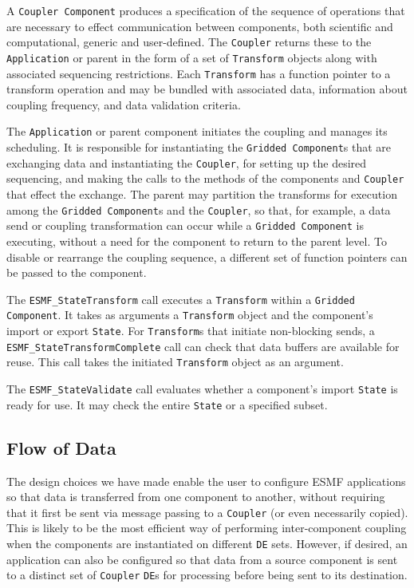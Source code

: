 A {\tt Coupler Component} produces a specification of the sequence of 
operations that are necessary to effect communication between components, 
both scientific and computational, generic and user-defined.  The {\tt Coupler} 
returns these to the {\tt Application} or parent in the form of a set of {\tt Transform} objects 
along with associated sequencing restrictions.  Each {\tt Transform} has a
function pointer to a transform operation and may be bundled with 
associated data, information about coupling frequency, and 
data validation criteria.

The {\tt Application} or parent component initiates the coupling and manages 
its scheduling.  It is responsible for instantiating the {\tt Gridded Component}s
that are exchanging data and instantiating the {\tt Coupler}, for setting up the desired 
sequencing, and making the calls to the methods of the components and 
{\tt Coupler} that effect the exchange.  The parent may partition the 
transforms
for execution among the {\tt Gridded Component}s and the {\tt Coupler}, so that, for 
example, a data send or coupling transformation can occur while a {\tt Gridded 
Component} is executing, without a need for the component to return to the
parent level.  
To disable or rearrange the coupling sequence, a different set of function
pointers can be passed to the component.

The {\tt ESMF\_StateTransform} call executes a {\tt Transform} 
within a {\tt Gridded Component}.  It takes as arguments a
{\tt Transform} object and the component's import or export {\tt State}.  
For {\tt Transform}s that initiate non-blocking sends, a {\tt ESMF\_StateTransformComplete} 
call can check that data  buffers are available for reuse.  This 
call takes the initiated {\tt Transform} object as an argument.

The {\tt ESMF\_StateValidate} call evaluates whether a component's 
import {\tt State} is ready for use.  It may check the entire {\tt State} or 
a specified subset.

\subsection{Flow of Data}
\label{sec:dataflow}
The design choices we have made enable the user to configure ESMF
applications so that data is transferred from one component to another, 
without requiring that it first be sent via message passing to a
{\tt Coupler} (or even necessarily
copied).  This is likely to be the most efficient way of performing 
inter-component coupling when the components are instantiated on different
{\tt DE} sets.  However, if desired, an application can also be configured so that
data from a source component is sent to a distinct set of {\tt Coupler} 
{\tt DE}s for processing before being sent to its destination.

